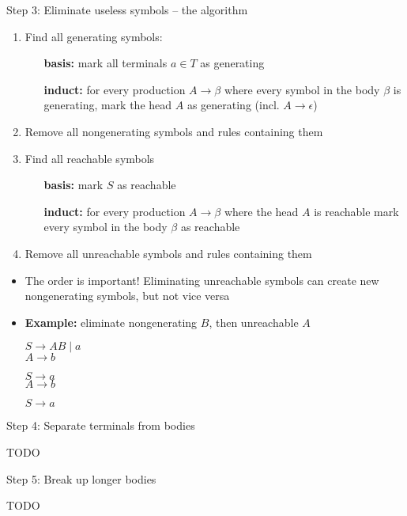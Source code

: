 \documentclass[handout]{beamer}
\begin{document}
\begin{frame}{Step 3: Eliminate useless symbols -- the algorithm}

	\begin{enumerate}
		\item Find all generating symbols:
		\begin{itemize}
			\item[\textbf{basis:}] mark all terminals $a\in T$ as generating
			\item[\textbf{induct:}] for every production $A\rightarrow\beta$ where every symbol in the body $\beta$ is generating, mark the head $A$ as generating (incl. $A\rightarrow \epsilon$)
		\end{itemize}
		\item Remove all \alert{nongenerating} symbols and rules containing them
		\item Find all reachable symbols
		\begin{itemize}
			\item[\textbf{basis:}] mark $S$ as reachable
			\item[\textbf{induct:}] for every production $A\rightarrow\beta$ where the head $A$ is reachable mark every symbol in the body $\beta$ as reachable
		\end{itemize}
		\item Remove all \alert{unreachable} symbols and rules containing them		
	\end{enumerate}

	\begin{itemize}
		\item The order is important! Eliminating unreachable symbols can create new nongenerating symbols, but not vice versa
		\item \textbf{Example:} eliminate nongenerating $B$, then unreachable $A$
		\smallskip
		\begin{center}
			\begin{minipage}{0.25\textwidth}
				$S\rightarrow AB\mid a$\\
				$A\rightarrow b$
			\end{minipage}
			\begin{minipage}{0.25\textwidth}
				$S\rightarrow a$\\
				$A\rightarrow b$
			\end{minipage}
			\begin{minipage}{0.25\textwidth}
				$S\rightarrow a$
			\end{minipage}
		\end{center}
	\end{itemize}

\end{frame}


\begin{frame}{Step 4: Separate terminals from bodies}

	TODO
	
\end{frame}


\begin{frame}{Step 5: Break up longer bodies}

	TODO

\end{frame}
\end{document}

